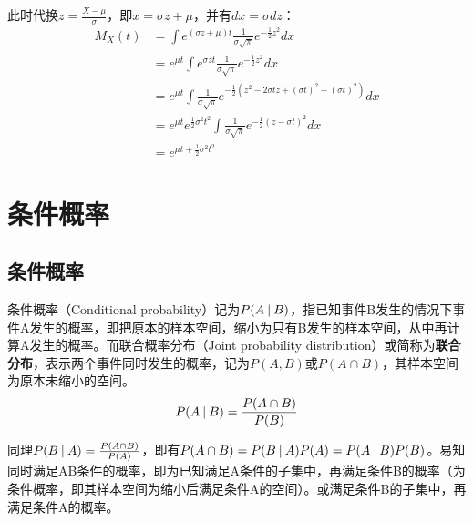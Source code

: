 \documentclass[11pt]{article}
\begin{document}
此时代换$z=\frac{X-\mu}{\sigma}$，即$x= \sigma z + \mu$，并有$dx=\sigma dz$：
\begin{align*}
    M_X(t) &= \int e^{(\sigma z + \mu)t} \frac{1}{\sigma\sqrt{\pi}} e^{-\frac{1}{2}z^2}dx \\
    &= e^{\mu t} \int e^{\sigma z t} \frac{1}{\sigma\sqrt{\pi}} e^{-\frac{1}{2}z^2}dx \\
    &= e^{\mu t} \int \frac{1}{\sigma\sqrt{\pi}} e^{-\frac{1}{2} (z^2 -2\sigma t z + (\sigma t)^2 -(\sigma t)^2)}dx \\
    &= e^{\mu t} e^{\frac{1}{2} \sigma^2 t^2} \int \frac{1}{\sigma\sqrt{\pi}} e^{-\frac{1}{2} (z - \sigma t)^2}dx \\
    &= e^{\mu t + \frac{1}{2} \sigma^2 t^2}
\end{align*}

\section{条件概率}

\subsection{条件概率}

条件概率（Conditional probability）记为$P(A\:\vert\: B)$，指已知事件B发生的情况下事件A发生的概率，即把原本的样本空间，缩小为只有B发生的样本空间，从中再计算A发生的概率。而联合概率分布（Joint probability distribution）或简称为\textbf{联合分布}，表示两个事件同时发生的概率，记为$P(A,B)$或$P(A\cap B)$，其样本空间为原本未缩小的空间。
\begin{equation*}
    P(A \:\vert\: B) = \frac{P(A \cap B)}{P(B)}
\end{equation*}

\begin{remark}
    同理$P(B\:\vert\: A) = \frac{P(A \cap B)}{P(A)}$，即有$P(A \cap B) = P(B\:\vert\: A)P(A) = P(A\:\vert\: B)P(B)$。易知同时满足AB条件的概率，即为已知满足A条件的子集中，再满足条件B的概率（为条件概率，即其样本空间为缩小后满足条件A的空间）。或满足条件B的子集中，再满足条件A的概率。
\end{remark}
\end{document}
